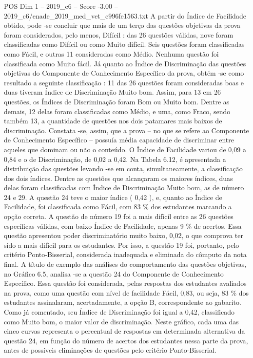 \begin{textsample}{POS Dim 1 – 2019\_c6 – Score -3.00 – 2019\_c6/enade\_2019\_med\_vet\_c996fe1563.txt}
A partir do Índice de Facilidade obtido, pode -se concluir que mais de um terço das questões objetivas da prova foram considerados, pelo menos, Difícil : das 26 questões válidas, nove foram classificadas como Difícil ou como Muito difícil.
Seis questões foram classificadas como Fácil, e outras 11 consideradas como Médio.
Nenhuma questão foi classificada como Muito fácil.
Já quanto ao Índice de Discriminação das questões objetivas do Componente de Conhecimento Específico da prova, obtém -se como resultado a seguinte classificação : 11 das 26 questões foram consideradas boas e duas tiveram Índice de Discriminação Muito bom.
Assim, para 13 em 26 questões, os Índices de Discriminação foram Bom ou Muito bom.
Dentre as demais, 12 delas foram classificadas como Médio, e uma, como Fraco, sendo também 13, a quantidade de questões nos dois patamares mais baixos de discriminação.
Constata -se, assim, que a prova – no que se refere ao Componente de Conhecimento Específico – possuía média capacidade de discriminar entre aqueles que dominam ou não o conteúdo.
O Índice de Facilidade variou de 0,09 a 0,84 e o de Discriminação, de 0,02 a 0,42.
Na Tabela 6.12, é apresentada a distribuição das questões levando -se em conta, simultaneamente, a classificação dos dois índices.
Dentre as questões que alcançaram os maiores índices, duas delas foram classificadas com Índice de Discriminação Muito bom, as de número 24 e 29.
A questão 24 teve o maior índice ( 0,42 ), e, quanto ao Índice de Facilidade, foi classificada como Fácil, com 83 \% dos estudantes marcando a opção correta.
A questão de número 19 foi a mais difícil entre as 26 questões específicas válidas, com baixo Índice de Facilidade, apenas 9 \% de acertos.
Essa questão apresentou poder discriminatório muito baixo, 0,02, o que comprova ter sido a mais difícil para os estudantes.
Por isso, a questão 19 foi, portanto, pelo critério Ponto-Bisserial, considerada inadequada e eliminada do cômputo da nota final.
A título de exemplo das análises do comportamento das questões objetivas, no Gráfico 6.5, analisa -se a questão 24 do Componente de Conhecimento Específico.
Essa questão foi considerada, pelas respostas dos estudantes avaliados na prova, como uma questão com nível de facilidade Fácil, 0,83, ou seja, 83 \% dos estudantes assinalaram, acertadamente, a opção B, correspondente ao gabarito.
Como já comentado, seu Índice de Discriminação foi igual a 0,42, classificado como Muito bom, o maior valor de discriminação.
Neste gráfico, cada uma das cinco curvas representa o percentual de respostas em determinada alternativa da questão 24, em função do número de acertos dos estudantes nessa parte da prova, antes de possíveis eliminações de questões pelo critério Ponto-Bisserial.

\end{textsample}
